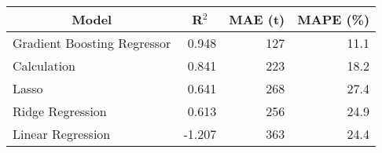 
\begin{tabular}[t]{lrrr}
\toprule
\multicolumn{1}{c}{Model} & \multicolumn{1}{c}{R$^2$} & \multicolumn{1}{c}{MAE (t)} & \multicolumn{1}{c}{MAPE (\%)}\\
\midrule
Gradient Boosting Regressor & 0.948 & 127 & 11.1\\
Calculation & 0.841 & 223 & 18.2\\
Lasso & 0.641 & 268 & 27.4\\
Ridge Regression & 0.613 & 256 & 24.9\\
Linear Regression & -1.207 & 363 & 24.4\\
\bottomrule
\end{tabular}
